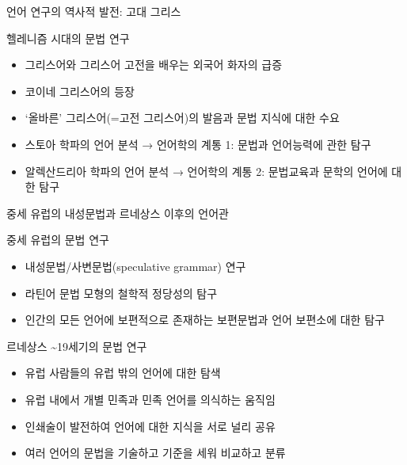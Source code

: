 \documentclass[11pt, aspectratio=169]{beamer}
\begin{document}
\begin{frame}[t]{언어 연구의 역사적 발전: 고대 그리스}
  \begin{block}{헬레니즘 시대의 문법 연구}
    \begin{itemize}
      \item 그리스어와 그리스어 고전을 배우는 외국어 화자의 급증
      \item 코이네 그리스어의 등장
      \item ‘올바른’ 그리스어(=고전 그리스어)의 발음과 문법 지식에 대한 수요
    \end{itemize}
  \end{block}
  \begin{itemize}
    \item 스토아 학파의 언어 분석 → 언어학의 계통 1: 문법과 언어능력에 관한 탐구
    \item 알렉산드리아 학파의 언어 분석 → 언어학의 계통 2: 문법교육과 문학의 언어에 대한 탐구
  \end{itemize}
\end{frame}

\begin{frame}[t]{중세 유럽의 내성문법과 르네상스 이후의 언어관}
  \begin{block}{중세 유럽의 문법 연구}
    \begin{itemize}
      \item 내성문법/사변문법(speculative grammar) 연구
      \item 라틴어 문법 모형의 철학적 정당성의 탐구
      \item 인간의 모든 언어에 보편적으로 존재하는 보편문법과 언어 보편소에 대한 탐구
    \end{itemize}    
  \end{block}
  \begin{block}{르네상스 \textasciitilde 19세기의 문법 연구}
    \begin{itemize}
      \item 유럽 사람들의 유럽 밖의 언어에 대한 탐색
      \item 유럽 내에서 개별 민족과 민족 언어를 의식하는 움직임
      \item 인쇄술이 발전하여 언어에 대한 지식을 서로 널리 공유
      \item 여러 언어의 문법을 기술하고 기준을 세워 비교하고 분류
    \end{itemize}
  \end{block}
\end{frame}
\end{document}

